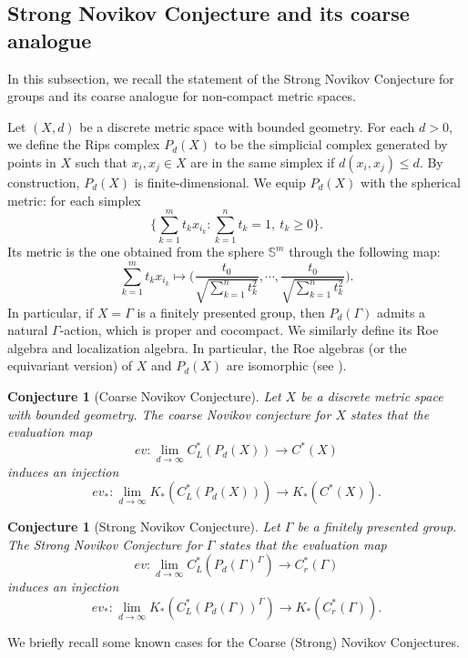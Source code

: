 \documentclass[12pt, reqno]{amsart}
\theoremstyle{plain}%
\newtheorem{conjecture}[theorem]{Conjecture}
\theoremstyle{definition}
\theoremstyle{remark}
\numberwithin{equation}{section}
\newcommand{\ind}{\textup{Ind}}
\newcommand{\sph}{\mathbb{S}}
\newcommand{\ev}{ev}
\begin{document}


\subsection{Strong Novikov Conjecture and its coarse analogue}\label{sec:Novikov}
In this subsection, we recall the statement of the Strong Novikov Conjecture for groups and its coarse analogue for non-compact metric spaces.

Let $(X,d)$ be a discrete metric space with bounded geometry.
For each $d>0$, we define the Rips complex $P_d(X)$ to be the simplicial complex generated by points in $X$ such that $x_i,x_j\in X$ are in the same simplex if $d(x_i,x_j)\leq d$. By construction, $P_d(X)$ is finite-dimensional. We equip $P_d(X)$ with the spherical metric: for each simplex
$$\{\sum_{k=1}^m t_kx_{i_k}:\sum_{k=1}^n t_k=1,~t_k\geq 0\}.$$
Its metric is the one obtained from the sphere $\sph^m$ through the following map:
$$\sum_{k=1}^m t_kx_{i_k}\mapsto\Big(\frac{t_0}{\sqrt{\sum_{k=1}^n t_k^2}},\cdots,\frac{t_0}{\sqrt{\sum_{k=1}^n t_k^2}}\Big).$$
In particular, if $X=\Gamma$ is a finitely presented group, then $P_d(\Gamma)$ admits a natural $\Gamma$-action, which is proper and cocompact. We similarly define its Roe algebra and localization algebra. 
In particular, the Roe algebras (or the equivariant version) of $X$ and $P_d(X)$ are isomorphic (see \cite[Proposition 3.7]{Yulocalization}).
\begin{conjecture}[Coarse Novikov Conjecture]\label{conj:coarseNovikov}
	Let $X$ be a discrete metric space with bounded geometry. The coarse Novikov conjecture for $X$ states that the evaluation map 
	$$\ev\colon \lim_{d\to\infty} C^*_L(P_d(X))\to  C^*(X)$$
	induces an injection
	$$\ev_*\colon \lim_{d\to\infty}K_*( C^*_L(P_d(X)))\to K_*( C^*(X)).$$
\end{conjecture}
\begin{conjecture}[Strong Novikov Conjecture]\label{conj:Novikov}
	Let $\Gamma$ be a finitely presented group. The Strong Novikov Conjecture for $\Gamma$ states that the evaluation map 
	$$\ev\colon \lim_{d\to\infty} C^*_L(P_d(\Gamma)^\Gamma)\to  C^*_r(\Gamma)$$
	induces an injection 
	$$\ev_*\colon \lim_{d\to\infty}K_*( C^*_L(P_d(\Gamma))^\Gamma)\to K_*( C^*_r(\Gamma)).$$
\end{conjecture}
We briefly recall some known cases for the Coarse (Strong) Novikov Conjectures. 
\end{document}
